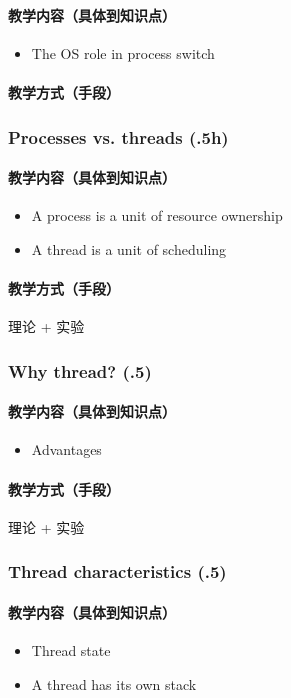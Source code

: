 \documentclass[11pt]{article}
\begin{document}
\paragraph{教学内容（具体到知识点）}
\label{sec-2-2-5-1}
\begin{itemize}
\item The OS role in process switch
\end{itemize}
\paragraph{教学方式（手段）}
\label{sec-2-2-5-2}
\subsubsection{Processes vs. threads (.5h)}
\label{sec-2-2-6}
\paragraph{教学内容（具体到知识点）}
\label{sec-2-2-6-1}
\begin{itemize}
\item A process is a unit of resource ownership
\item A thread is a unit of scheduling
\end{itemize}
\paragraph{教学方式（手段）}
\label{sec-2-2-6-2}
理论 + 实验
\subsubsection{Why thread? (.5)}
\label{sec-2-2-7}
\paragraph{教学内容（具体到知识点）}
\label{sec-2-2-7-1}
\begin{itemize}
\item Advantages
\end{itemize}
\paragraph{教学方式（手段）}
\label{sec-2-2-7-2}
理论 + 实验
\subsubsection{Thread characteristics (.5)}
\label{sec-2-2-8}
\paragraph{教学内容（具体到知识点）}
\label{sec-2-2-8-1}
\begin{itemize}
\item Thread state
\item A thread has its own stack
\end{itemize}
\end{document}
